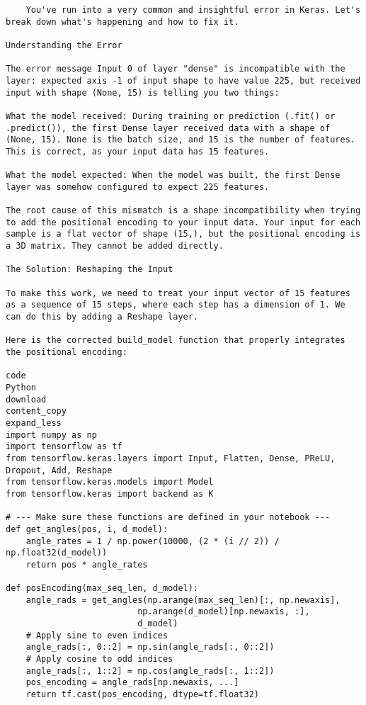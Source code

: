 \documentclass{article}
\begin{document}
\begin{verbatim}
    You've run into a very common and insightful error in Keras. Let's break down what's happening and how to fix it.

Understanding the Error

The error message Input 0 of layer "dense" is incompatible with the layer: expected axis -1 of input shape to have value 225, but received input with shape (None, 15) is telling you two things:

What the model received: During training or prediction (.fit() or .predict()), the first Dense layer received data with a shape of (None, 15). None is the batch size, and 15 is the number of features. This is correct, as your input data has 15 features.

What the model expected: When the model was built, the first Dense layer was somehow configured to expect 225 features.

The root cause of this mismatch is a shape incompatibility when trying to add the positional encoding to your input data. Your input for each sample is a flat vector of shape (15,), but the positional encoding is a 3D matrix. They cannot be added directly.

The Solution: Reshaping the Input

To make this work, we need to treat your input vector of 15 features as a sequence of 15 steps, where each step has a dimension of 1. We can do this by adding a Reshape layer.

Here is the corrected build_model function that properly integrates the positional encoding:

code
Python
download
content_copy
expand_less
import numpy as np
import tensorflow as tf
from tensorflow.keras.layers import Input, Flatten, Dense, PReLU, Dropout, Add, Reshape
from tensorflow.keras.models import Model
from tensorflow.keras import backend as K

# --- Make sure these functions are defined in your notebook ---
def get_angles(pos, i, d_model):
    angle_rates = 1 / np.power(10000, (2 * (i // 2)) / np.float32(d_model))
    return pos * angle_rates

def posEncoding(max_seq_len, d_model):
    angle_rads = get_angles(np.arange(max_seq_len)[:, np.newaxis],
                          np.arange(d_model)[np.newaxis, :],
                          d_model)
    # Apply sine to even indices
    angle_rads[:, 0::2] = np.sin(angle_rads[:, 0::2])
    # Apply cosine to odd indices
    angle_rads[:, 1::2] = np.cos(angle_rads[:, 1::2])
    pos_encoding = angle_rads[np.newaxis, ...]
    return tf.cast(pos_encoding, dtype=tf.float32)


\end{verbatim}
\end{document}
